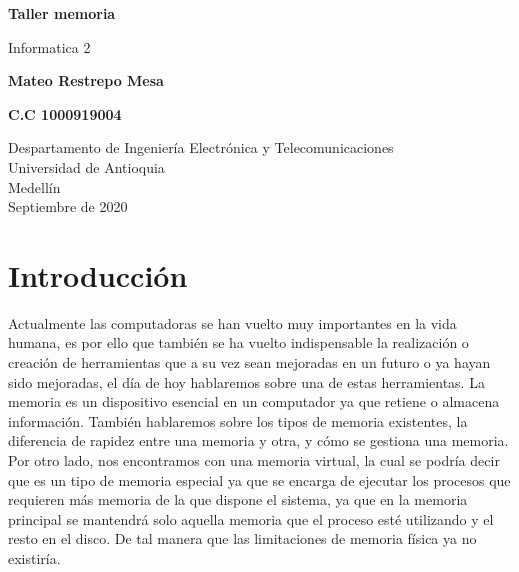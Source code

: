 \documentclass{article}
\begin{document}
\begin{titlepage}
    \begin{center}
        \vspace*{1cm}
            
        \Huge
        \textbf{Taller memoria}
        
        \vspace{0.5cm}
        \LARGE
        Informatica 2
            
        \vspace{2.5cm}
            
        \textbf{ Mateo Restrepo Mesa }
        
        \newline
        
        \textbf{ C.C 1000919004}
            
        \vfill
            
        \vspace{0.8cm}
            
        \Large
        Despartamento de Ingeniería Electrónica y Telecomunicaciones\\
        Universidad de Antioquia\\
        Medellín\\
        Septiembre de 2020
            
    \end{center}
\end{titlepage}
\tableofcontents
\newpage

\section{Introducción}

Actualmente las computadoras se han vuelto muy importantes en la vida 
humana, es por ello que también se ha vuelto indispensable la realización o creación de 
herramientas que a su vez sean mejoradas en un futuro o ya hayan sido mejoradas, el día de hoy hablaremos sobre una de estas herramientas. 
La memoria es un dispositivo esencial en un computador ya que retiene o almacena información. 
También hablaremos sobre los tipos de memoria existentes, la diferencia de rapidez entre una memoria y otra, y cómo se gestiona una memoria.
Por otro lado, nos encontramos con una memoria virtual, la cual se podría decir que es un tipo de memoria especial ya que se encarga de ejecutar los procesos que requieren más memoria de la que dispone el sistema, ya que en la memoria principal se mantendrá solo aquella memoria que el proceso esté utilizando y el resto en el disco. De tal manera que las limitaciones de memoria física ya no existiría.
\end{document}
